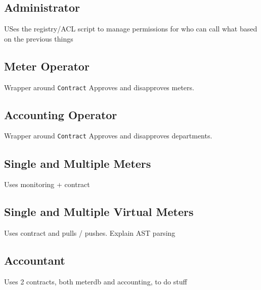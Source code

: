 \subsection{Administrator}
USes the registry/ACL script to manage permissions for who can call what based on the previous things

\subsection{Meter Operator}
Wrapper around \texttt{Contract}
Approves and disapproves meters.

\subsection{Accounting Operator}
Wrapper around \texttt{Contract}
Approves and disapproves departments.

\subsection{Single and Multiple Meters}
Uses monitoring + contract

\subsection{Single and Multiple Virtual Meters}
Uses contract and pulls / pushes. Explain AST parsing

\subsection{Accountant}
Uses 2 contracts, both meterdb and accounting, to do stuff





